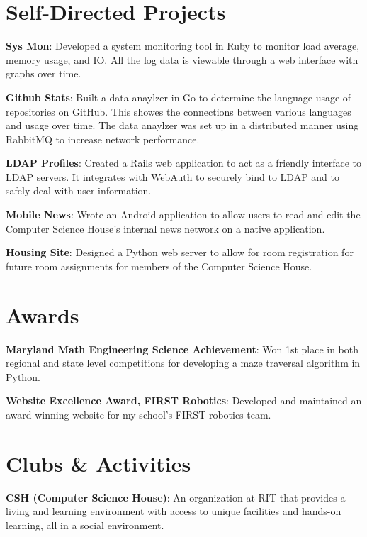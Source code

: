 \documentclass[a4paper,margin,line]{resume}
\begin{document}
\begin{resume}
\section{\mysidestyle Self-Directed Projects}
    \begin{asparablank}
        \item \textbf{Sys Mon}: Developed a system monitoring tool in Ruby to monitor
            load average, memory usage, and IO. All the log
            data is viewable through a web interface with graphs over time. \\
        \item \textbf{Github Stats}: Built a data anaylzer in Go to determine the language
            usage of repositories on GitHub. This showes the connections between
            various languages and usage over time. The data anaylzer was set up in a
            distributed manner using RabbitMQ to increase network performance. \\
        \item \textbf{LDAP Profiles}: Created a Rails web application to act as a
            friendly interface to LDAP servers. It integrates with WebAuth to
            securely bind to LDAP and to safely deal with user information. \\
        \item \textbf{Mobile News}: Wrote an Android application to allow users to read 
            and edit the Computer Science House’s internal news network on a 
            native application. \\
        \item \textbf{Housing Site}: Designed a Python web server to allow for room 
            registration for future room assignments for members of the Computer
            Science House.
    \end{asparablank}
\section{\mysidestyle Awards}
    \begin{asparablank}
        \item \textbf{Maryland Math Engineering Science Achievement}: Won 1st place
            in both regional and state level competitions for developing a maze
            traversal algorithm in Python. \\
        \item \textbf{Website Excellence Award, FIRST Robotics}: Developed and maintained an
            award-winning website for my school's FIRST robotics team.
    \end{asparablank}
\section{\mysidestyle Clubs \& Activities}
    \begin{asparablank}
        \item \textbf{CSH (Computer Science House)}: An organization at RIT that
            provides a living and learning environment with access to unique facilities
            and hands-on learning, all in a social environment.
    \end{asparablank}
\end{resume}
\end{document}

